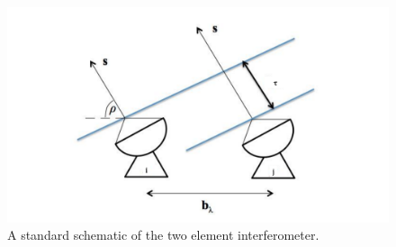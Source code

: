 \begin{figure}[]
\begin{center}
\includegraphics[width=1.\textwidth]{Bernardi/2_element_interferometer}
\end{center}
\caption{A standard schematic of the two element interferometer.}
\label{fig:fig1}
\end{figure}

